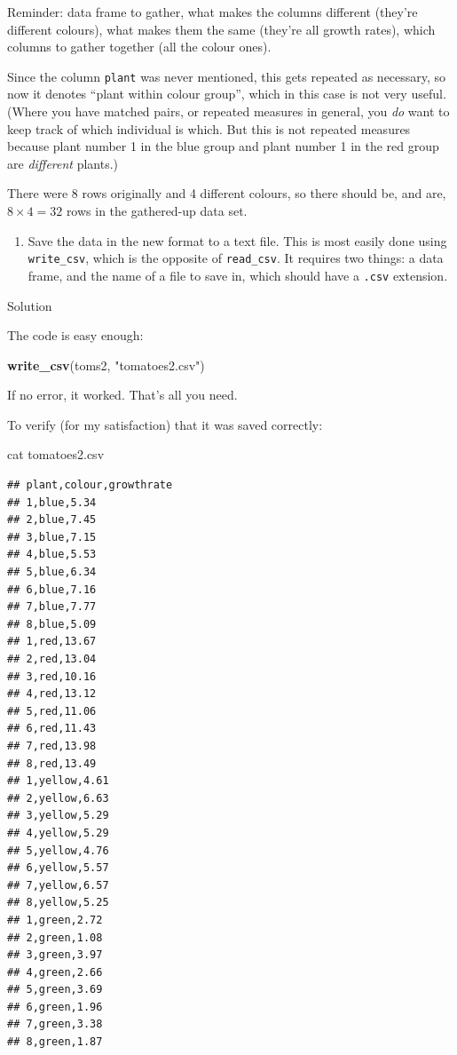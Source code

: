 \documentclass[]{tufte-book}
\newenvironment{Shaded}{}{}
\newcommand{\FunctionTok}[1]{\textcolor[rgb]{0.02,0.16,0.49}{#1}}
\newcommand{\KeywordTok}[1]{\textcolor[rgb]{0.00,0.44,0.13}{\textbf{#1}}}
\newcommand{\NormalTok}[1]{#1}
\newcommand{\StringTok}[1]{\textcolor[rgb]{0.25,0.44,0.63}{#1}}
\providecommand{\tightlist}{%
  \setlength{\itemsep}{0pt}\setlength{\parskip}{0pt}}
\theoremstyle{definition}
\theoremstyle{definition}
\theoremstyle{definition}
\theoremstyle{remark}
\begin{document}
Reminder: data frame to gather, what makes the columns different
(they're different colours), what makes them the same (they're all
growth rates), which columns to gather together (all the colour ones).

Since the column \texttt{plant} was never mentioned, this gets repeated
as necessary, so now it denotes ``plant within colour group'', which in
this case is not very useful. (Where you have matched pairs, or repeated
measures in general, you \emph{do} want to keep track of which
individual is which. But this is not repeated measures because plant
number 1 in the blue group and plant number 1 in the red group are
\emph{different} plants.)

There were 8 rows originally and 4 different colours, so there should
be, and are, \(8 \times 4=32\) rows in the gathered-up data set.

\begin{enumerate}
\def\labelenumi{(\alph{enumi})}
\setcounter{enumi}{2}
\tightlist
\item
  Save the data in the new format to a text file. This is most easily
  done using \texttt{write\_csv}, which is the opposite of
  \texttt{read\_csv}. It requires two things: a data frame, and the name
  of a file to save in, which should have a \texttt{.csv} extension.
\end{enumerate}

Solution

The code is easy enough:

\begin{Shaded}
\begin{Highlighting}[]
\KeywordTok{write_csv}\NormalTok{(toms2, }\StringTok{"tomatoes2.csv"}\NormalTok{)}
\end{Highlighting}
\end{Shaded}

If no error, it worked. That's all you need.

To verify (for my satisfaction) that it was saved correctly:

\begin{Shaded}
\begin{Highlighting}[]
\FunctionTok{cat}\NormalTok{ tomatoes2.csv }
\end{Highlighting}
\end{Shaded}

\begin{verbatim}
## plant,colour,growthrate
## 1,blue,5.34
## 2,blue,7.45
## 3,blue,7.15
## 4,blue,5.53
## 5,blue,6.34
## 6,blue,7.16
## 7,blue,7.77
## 8,blue,5.09
## 1,red,13.67
## 2,red,13.04
## 3,red,10.16
## 4,red,13.12
## 5,red,11.06
## 6,red,11.43
## 7,red,13.98
## 8,red,13.49
## 1,yellow,4.61
## 2,yellow,6.63
## 3,yellow,5.29
## 4,yellow,5.29
## 5,yellow,4.76
## 6,yellow,5.57
## 7,yellow,6.57
## 8,yellow,5.25
## 1,green,2.72
## 2,green,1.08
## 3,green,3.97
## 4,green,2.66
## 5,green,3.69
## 6,green,1.96
## 7,green,3.38
## 8,green,1.87
\end{verbatim}
\end{document}
